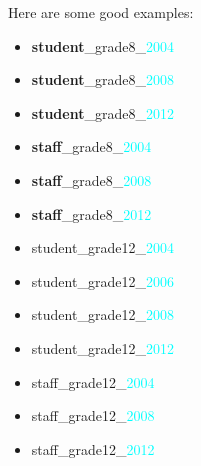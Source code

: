 Here are some good examples:
\begin{itemize}[label=]
	\item   {\textcolor{uscred}{\textbf{student}}}\_grade8\_{\textcolor{cyan}{2004}}
	\item   {\textcolor{uscred}{\textbf{student}}}\_grade8\_{\textcolor{cyan}{2008}}
	\item   {\textcolor{uscred}{\textbf{student}}}\_grade8\_{\textcolor{cyan}{2012}}
	\item   {\textcolor{uscgold}{\textbf{staff}}}\_grade8\_{\textcolor{cyan}{2004}}
	\item   {\textcolor{uscgold}{\textbf{staff}}}\_grade8\_{\textcolor{cyan}{2008}}
	\item   {\textcolor{uscgold}{\textbf{staff}}}\_grade8\_{\textcolor{cyan}{2012}}
	\item   {\textcolor{uscred}{\textsf{student}}}\_grade12\_{\textcolor{cyan}{2004}}
	\item   {\textcolor{uscred}{\textsf{student}}}\_grade12\_{\textcolor{cyan}{2006}}
	\item   {\textcolor{uscred}{\textsf{student}}}\_grade12\_{\textcolor{cyan}{2008}}
	\item   {\textcolor{uscred}{\textsf{student}}}\_grade12\_{\textcolor{cyan}{2012}}
	\item   {\textcolor{uscgold}{\textsf{staff}}}\_grade12\_{\textcolor{cyan}{2004}}
	\item   {\textcolor{uscgold}{\textsf{staff}}}\_grade12\_{\textcolor{cyan}{2008}}
	\item   {\textcolor{uscgold}{\textsf{staff}}}\_grade12\_{\textcolor{cyan}{2012}}
\end{itemize}


